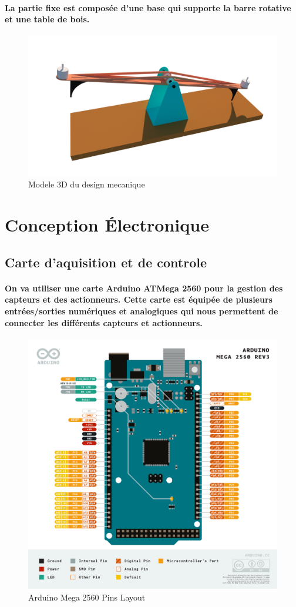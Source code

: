 \paragraph{La partie fixe est composée d'une base qui supporte la barre rotative et une table de bois.}
\begin{figure}[!htpb]
	\centering
	\includegraphics[width=\linewidth]{Figures/3d-cad.png}
	\caption{Modele 3D du design mecanique}
	\label{fig:3d-model}
\end{figure}
\section{Conception Électronique}

\subsection{Carte d'aquisition et de controle}

\paragraph{
	On va utiliser une carte Arduino ATMega 2560 pour la gestion des capteurs et des actionneurs. Cette carte est équipée de plusieurs entrées/sorties numériques et analogiques qui nous permettent de connecter les différents capteurs et actionneurs.
}

\begin{figure}[!htpb]
    \centering
    \includegraphics[width=0.6\linewidth]{Figures/arduino.png}
    \caption{Arduino Mega 2560 Pins Layout}
    \label{fig:ArduinoMega2560}
\end{figure}

